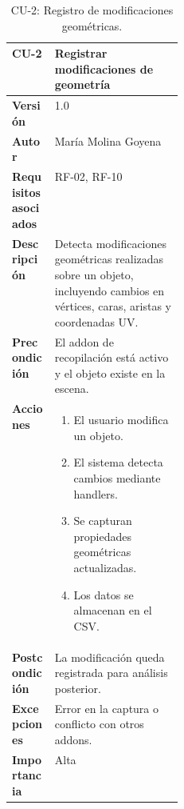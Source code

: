 \begin{table}[p]
\centering
\begin{tabularx}{\linewidth}{p{0.25\linewidth} X}
\toprule
\textbf{CU-2} & Registrar modificaciones de geometría \\
\midrule
\textbf{Versión} & 1.0 \\
\textbf{Autor} & María Molina Goyena \\
\textbf{Requisitos asociados} & RF-02, RF-10 \\
\textbf{Descripción} & Detecta modificaciones geométricas realizadas sobre un objeto, incluyendo cambios en vértices, caras, aristas y coordenadas UV. \\
\textbf{Precondición} & El addon de recopilación está activo y el objeto existe en la escena. \\
\textbf{Acciones} &
\begin{minipage}[t]{\linewidth}
\begin{enumerate}
    \item El usuario modifica un objeto.
    \item El sistema detecta cambios mediante handlers.
    \item Se capturan propiedades geométricas actualizadas.
    \item Los datos se almacenan en el CSV.
\end{enumerate}
\end{minipage} \\
\textbf{Postcondición} & La modificación queda registrada para análisis posterior. \\
\textbf{Excepciones} & Error en la captura o conflicto con otros addons. \\
\textbf{Importancia} & Alta \\
\bottomrule
\end{tabularx}
\caption{CU-2: Registro de modificaciones geométricas.}
\label{tab:cu2}
\end{table}

